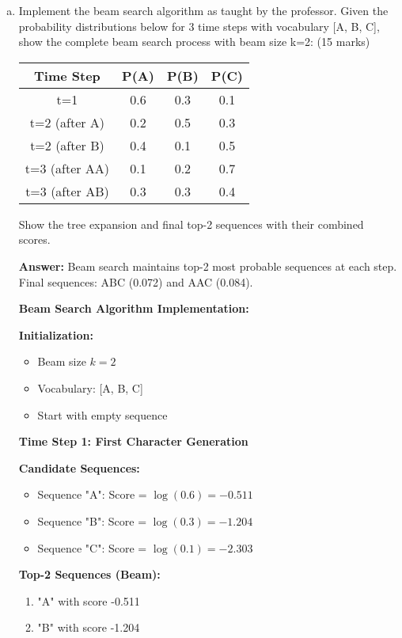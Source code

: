 \documentclass[12pt]{article}
\newcommand{\answer}[1]{{\color{answercolor}\textbf{Answer:} #1}}
\newcommand{\explanation}[1]{{\color{explanationcolor}#1}}
\begin{document}
\begin{enumerate}[(a)]
    \item Implement the beam search algorithm as taught by the professor. Given the probability distributions below for 3 time steps with vocabulary [A, B, C], show the complete beam search process with beam size k=2: \hfill (15 marks)
    
    \begin{center}
    \begin{tabular}{|c|c|c|c|}
    \hline
    Time Step & P(A) & P(B) & P(C) \\
    \hline
    t=1 & 0.6 & 0.3 & 0.1 \\
    t=2 (after A) & 0.2 & 0.5 & 0.3 \\
    t=2 (after B) & 0.4 & 0.1 & 0.5 \\
    t=3 (after AA) & 0.1 & 0.2 & 0.7 \\
    t=3 (after AB) & 0.3 & 0.3 & 0.4 \\
    \hline
    \end{tabular}
    \end{center}
    
    Show the tree expansion and final top-2 sequences with their combined scores.
    
    \answer{Beam search maintains top-2 most probable sequences at each step. Final sequences: ABC (0.072) and AAC (0.084).}
    
    \explanation{
    \textbf{Beam Search Algorithm Implementation:}
    
    \textbf{Initialization:}
    \begin{itemize}
        \item Beam size $k = 2$
        \item Vocabulary: [A, B, C]
        \item Start with empty sequence
    \end{itemize}
    
    \textbf{Time Step 1: First Character Generation}
    
    \textbf{Candidate Sequences:}
    \begin{itemize}
        \item Sequence "A": Score = $\log(0.6) = -0.511$
        \item Sequence "B": Score = $\log(0.3) = -1.204$
        \item Sequence "C": Score = $\log(0.1) = -2.303$
    \end{itemize}
    
    \textbf{Top-2 Sequences (Beam):}
    \begin{enumerate}
        \item "A" with score -0.511
        \item "B" with score -1.204
    \end{enumerate}
    
}
\end{enumerate}
\end{document}

